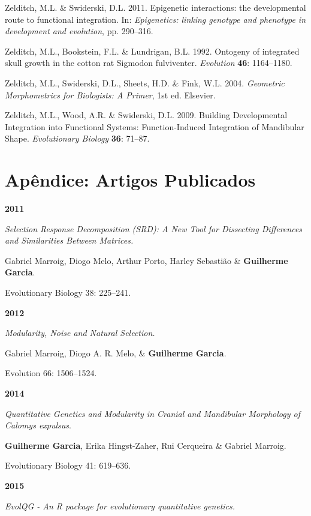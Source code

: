 \documentclass[12pt,twoside]{report}
\begin{document}
Zelditch, M.L. \& Swiderski, D.L. 2011. Epigenetic interactions: the
developmental route to functional integration. In: \emph{Epigenetics:
linking genotype and phenotype in development and evolution}, pp.
290--316.

Zelditch, M.L., Bookstein, F.L. \& Lundrigan, B.L. 1992. Ontogeny of
integrated skull growth in the cotton rat Sigmodon fulviventer.
\emph{Evolution} \textbf{46}: 1164--1180.

Zelditch, M.L., Swiderski, D.L., Sheets, H.D. \& Fink, W.L. 2004.
\emph{Geometric Morphometrics for Biologists: A Primer}, 1st ed.
Elsevier.

Zelditch, M.L., Wood, A.R. \& Swiderski, D.L. 2009. Building
Developmental Integration into Functional Systems: Function-Induced
Integration of Mandibular Shape. \emph{Evolutionary Biology}
\textbf{36}: 71--87.

\chapter*{Apêndice: Artigos Publicados}

\textbf{2011}

\textit{Selection Response Decomposition (SRD): A New Tool for Dissecting Differences and Similarities Between Matrices.}

Gabriel Marroig, Diogo Melo, Arthur Porto, Harley Sebastião \& \textbf{Guilherme Garcia}.

Evolutionary Biology 38: 225–241.

\vspace {0.3 cm}

\textbf {2012}

\textit {Modularity, Noise and Natural Selection.}

Gabriel Marroig, Diogo A. R. Melo, \& \textbf {Guilherme Garcia}.  

Evolution 66: 1506–1524.

\vspace {0.3 cm}

\textbf{2014}

\textit{Quantitative Genetics and Modularity in Cranial and Mandibular Morphology of \emph{Calomys expulsus}}.

\textbf {Guilherme Garcia}, Erika Hingst-Zaher, Rui Cerqueira \& Gabriel Marroig.

Evolutionary Biology 41: 619–636.

\vspace {0.3 cm}

\textbf{2015}

\textit {EvolQG - An R package for evolutionary quantitative genetics.}
\end{document}
